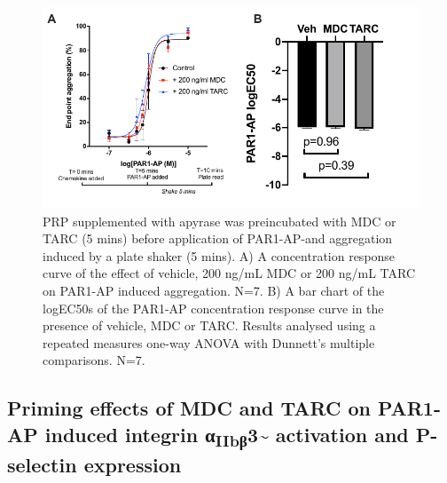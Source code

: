 \documentclass[11pt,twoside]{bristolthesis}
\begin{document}
\begin{figure}
\includegraphics{figure/Chemokines/Layouts/MDC_TARC_PRP_plate_agg} \caption[The priming effect of the chemokines MDC and TARC on PAR1-AP induced platelet aggregation in PRP using plate aggregation]{PRP supplemented with apyrase was preincubated with MDC or TARC (5 mins) before application of PAR1-AP-and aggregation induced by a plate shaker (5 mins). A) A concentration response curve of the effect of vehicle, 200 ng/mL MDC or 200 ng/mL TARC on PAR1-AP induced aggregation. N=7. B) A bar chart of the logEC50s of the PAR1-AP concentration response curve in the presence of vehicle, MDC or TARC. Results analysed using a repeated measures one-way ANOVA with Dunnett's multiple comparisons. N=7.}\label{fig:MDC-TARC-agg-PRP}
\end{figure}
\hypertarget{priming-effects-of-mdc-and-tarc-on-par1-ap-induced-integrin-ux3b1iibux3b23-activation-and-p-selectin-expression}{%
\subsection{\texorpdfstring{Priming effects of MDC and TARC on PAR1-AP induced integrin α\textsubscript{IIbβ}3\textasciitilde{} activation and P-selectin expression}{Priming effects of MDC and TARC on PAR1-AP induced integrin αIIbβ3\textasciitilde{} activation and P-selectin expression}}\label{priming-effects-of-mdc-and-tarc-on-par1-ap-induced-integrin-ux3b1iibux3b23-activation-and-p-selectin-expression}}
\end{document}
